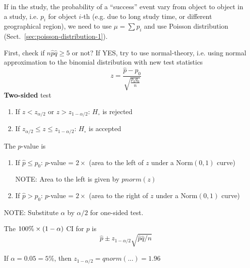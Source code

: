 \begin{framed}
  If in the study, the probability of a ``success'' event vary from
  object to object in a study, i.e. $p_i$ for object $i$-th (e.g. due
  to long study time, or different geographical region), we need to
  use $\mu=\sum p_i$ and use Poisson distribution
  (Sect.~\ref{sec:poisson-distribution-1}). 
\end{framed}

First, check if $n\hat{p}\hat{q} \ge 5$ or not? If YES, try to use
normal-theory, i.e. using normal approximation to the binomial
distribution with new test statistics
\begin{equation}
  \label{eq:76}
  z = \frac{\hat{p}-p_0}{\sqrt{\frac{p_0q_0}{n}}}
\end{equation}
{\bf Two-sided} test
\begin{enumerate}
\item If $z < z_{\alpha/2}$ or $z > z_{1-\alpha/2}$: $H_\circ$ is
  rejected
\item If $z_{\alpha/2} \le z \le z_{1-\alpha/2}$: $H_\circ$ is accepted
\end{enumerate}
The $p$-value is
\begin{enumerate}
\item If $\hat{p} \le p_0$: $p$-value = $2\times$ (area to the left
  of $z$ under a $\text{Norm}(0,1)$ curve)

  NOTE: Area to the left is given by $pnorm(z)$

\item If $\hat{p} > p_0$: $p$-value = $2\times$ (area to the right
  of $z$ under a $\text{Norm}(0,1)$ curve)
\end{enumerate}

\begin{framed}
  NOTE: Substitute $\alpha$ by $\alpha/2$ for one-sided test. 
\end{framed}
The $100\%\times (1-\alpha)$ CI for $p$ is
\begin{equation}
  \label{eq:96}
  \hat{p} \pm z_{1-\alpha/2} \sqrt{\hat{p}\hat{q}/n}
\end{equation}

\begin{framed}
  If $\alpha = 0.05 = 5\%$, then $z_{1-\alpha/2}=qnorm(...) = 1.96$
\end{framed}

